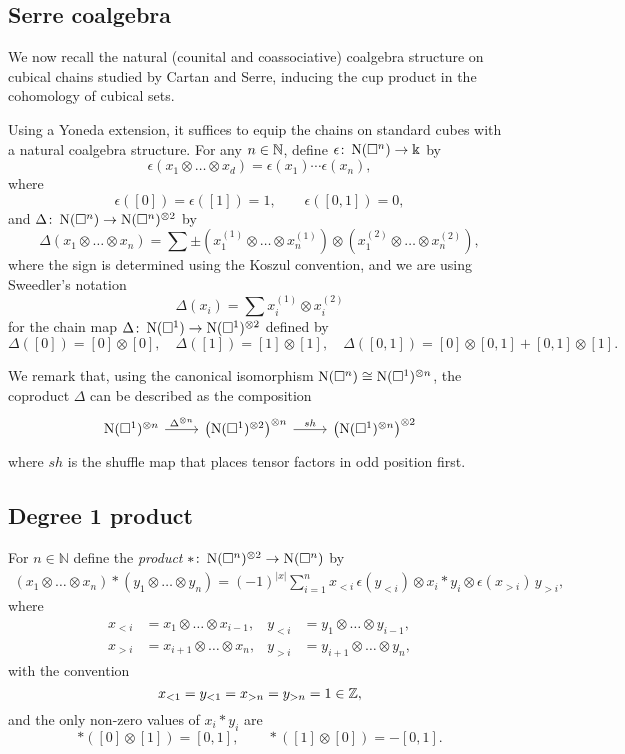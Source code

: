 \subsection{Serre coalgebra} \label{ss:serre coalgebra}

We now recall the natural (counital and coassociative) coalgebra structure on cubical chains studied by Cartan and Serre, inducing the cup product in the cohomology of cubical sets.

Using a Yoneda extension, it suffices to equip the chains on standard cubes with a natural coalgebra structure.
For any $n \in \mathbb{N}$, define $\epsilon \colon \operatorname{N}(\square^n) \to \Bbbk$ by
\[
\epsilon \left( x_1 \otimes \dots \otimes x_d \right) = \epsilon(x_1) \dotsm \epsilon(x_n),
\]
where
\[
\epsilon([0]) = \epsilon([1]) = 1, \qquad \epsilon([0, 1]) = 0,
\]
and $\Delta \colon \operatorname{N}(\square^n) \to \operatorname{N}(\square^n)^{\otimes 2}$ by
\[
\Delta (x_1 \otimes \dots \otimes x_n) =
\sum \pm \left( x_1^{(1)} \otimes \dots \otimes x_n^{(1)} \right) \otimes
\left( x_1^{(2)} \otimes \dots \otimes x_n^{(2)} \right),
\]
where the sign is determined using the Koszul convention, and we are using Sweedler's notation
\[
\Delta(x_i) = \sum x_i^{(1)} \otimes x_i^{(2)}
\]
for the chain map $\Delta \colon \operatorname{N}(\square^1) \to \operatorname{N}(\square^1)^{\otimes 2}$ defined by
\[
\Delta([0]) = [0] \otimes [0], \quad \Delta([1]) = [1] \otimes [1], \quad \Delta([0,1]) = [0] \otimes [0,1] + [0,1] \otimes [1].
\]

We remark that, using the canonical isomorphism $\operatorname{N}(\square^n) \cong \operatorname{N}(\square^1)^{\otimes n}$, the coproduct $\Delta$ can be described as the composition
\[
\begin{tikzcd}
\chains(\cube^1)^{\otimes n} \arrow[r, "\Delta^{\otimes n}"] & \left( \chains(\cube^1)^{\otimes 2} \right)^{\otimes n} \arrow[r, "sh"] & \left( \chains(\cube^1)^{\otimes n} \right)^{\otimes 2}
\end{tikzcd}
\]
where $sh$ is the shuffle map that places tensor factors in odd position first.

\subsection{Degree 1 product}

For $n \in \mathbb{N}$ define the \textit{product} $\ast  \colon \operatorname{N}(\square^n)^{\otimes 2} \to \operatorname{N}(\square^n)$ by
\begin{align*}
(x_1 \otimes \dots \otimes x_n) \ast (y_1 \otimes \dots \otimes y_n) =
(-1)^{|x|} \sum_{i=1}^n x_{<i}\, \epsilon(y_{<i}) \otimes x_i \ast y_i \otimes \epsilon(x_{>i}) \, y_{>i},
\end{align*}
where
\begin{align*}
x_{<i} & = x_1 \otimes \dots \otimes x_{i-1}, &
y_{<i} & = y_1 \otimes \dots \otimes y_{i-1}, \\
x_{>i} & = x_{i+1} \otimes \dots \otimes x_n, &
y_{>i} & = y_{i+1} \otimes \dots \otimes y_n,
\end{align*}
with the convention
\[
x_{<1} = y_{<1} = x_{>n} = y_{>n} = 1 \in \mathbb{Z},
\]
and the only non-zero values of $x_i \ast y_i$ are
\[
\ast([0] \otimes [1]) = [0, 1], \qquad  \ast([1] \otimes [0]) = -[0, 1].
\]

